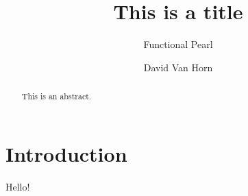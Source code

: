\documentclass[acmlarge,anonymous]{acmart}
\newcommand{\sectionNewpage}{}
\newcommand{\preDoc}{}
\newcommand{\postDoc}{}
\let\SOriginalthesubsection\thesubsection
\newcommand{\Ssection}[2]{\section[#1]{#2}\let\thesubsection\SOriginalthesubsection}
\begin{document}
\preDoc
\label{t:x28part_x28gentag_0x29x29}


\title{This is a title}
\subtitle{Functional Pearl}

\author{David Van Horn}



\begin{abstract}This is an abstract.\end{abstract}

\noindent \maketitle{}

\sectionNewpage

\Ssection{Introduction}{Introduction}\label{t:x28part_x22Introductionx22x29}

Hello!

\postDoc
\end{document}
